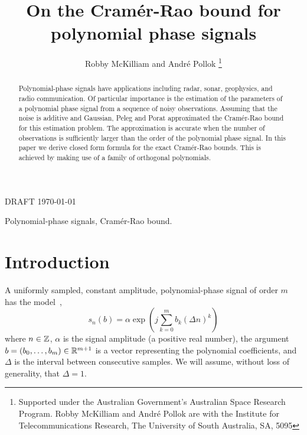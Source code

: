 \documentclass[journal,10pt]{IEEEtran}
\begin{document}
\title{On the Cram\'{e}r-Rao bound for polynomial phase signals}

\author{Robby McKilliam and Andr\'{e} Pollok%
\thanks{Supported under the Australian Government's Australian Space Research Program.
Robby McKilliam and Andr\'{e} Pollok are with the Institute for Telecommunications Research, The University of South Australia, SA, 5095}
}
%
{DRAFT \today}



\maketitle


\begin{abstract}
Polynomial-phase signals have applications including radar, sonar, geophysics, and radio communication.  Of particular importance is the estimation of the parameters of a polynomial phase signal from a sequence of noisy observations.  Assuming that the noise is additive and Gaussian,  Peleg and Porat approximated the Cram\'{e}r-Rao bound for this estimation problem.  The approximation is accurate when the number of observations is sufficiently larger than the order of the polynomial phase signal.  In this paper we derive closed form formula for the exact Cram\'{e}r-Rao bounds.  This is achieved by making use of a family of orthogonal polynomials.
\end{abstract}

\begin{IEEEkeywords}
Polynomial-phase signals, Cram\'{e}r-Rao bound.
\end{IEEEkeywords}



\section{Introduction}

A uniformly sampled, constant amplitude, polynomial-phase signal of order $m$ has the model~\cite{Peleg_DPT_1995, Peleg1991_CRB_PPS_1991, Peleg1991_est_class_PPS_1991},
\[
s_n(b) = \alpha \exp\left( j \sum_{k = 0}^{m}{b_k (\Delta n)^k}\right)
\]
where $n \in {\mathbb Z}$, $\alpha$ is the signal amplitude (a positive real number), the argument $b=(b_0, \dots, b_m)\in{\mathbb R}^{m+1}$ is a vector representing the polynomial coefficients,  and $\Delta$ is the interval between consecutive samples.  We will assume, without loss of generality, that $\Delta = 1$.
\end{document}
